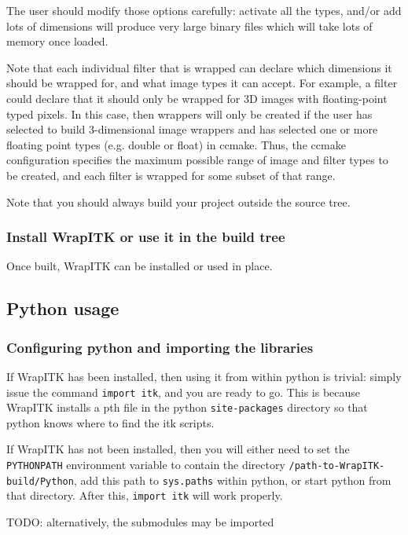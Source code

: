 \documentclass{InsightArticle}
\begin{document}
The user should modify those options carefully: activate all the types, and/or
add lots of dimensions will produce very large binary files which will take lots
of memory once loaded.

Note that each individual filter that is wrapped can declare which dimensions it
should be wrapped for, and what image types it can accept. For example, a filter
could declare that it should only be wrapped for 3D images with floating-point
typed pixels. In this case, then wrappers will only be created if the user has
selected to build 3-dimensional image wrappers and has selected one or more
floating point types (e.g. double or float) in ccmake. Thus, the ccmake
configuration specifies the maximum possible range of image and filter types to
be created, and each filter is wrapped for some subset of that range. 

Note that you should always build your project outside the source tree.

    \subsubsection{Install WrapITK or use it in the build tree}

Once built, WrapITK can be installed or used in place.

  \subsection{Python usage}

     \subsubsection{Configuring python and importing the libraries}

If WrapITK has been installed, then using it from within python is trivial:
simply issue the command \verb$import itk$, and you are ready to go. This
is because WrapITK installs a pth file in the python \verb$site-packages$ directory so
that python knows where to find the itk scripts.

If WrapITK has not been installed, then you will either need to set the
\verb$PYTHONPATH$ environment variable to contain the directory
\verb$/path-to-WrapITK-build/Python$, add  this path to \verb$sys.paths$ within python, or
start python from that directory. After this, \verb$import itk$ will work
properly.


TODO: alternatively, the submodules may be imported
\end{document}
